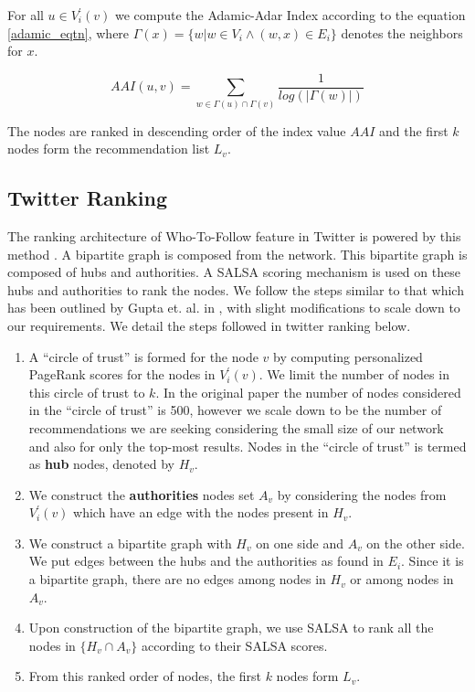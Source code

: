 For all $u \in V^{\prime}_{i}(v)$ we compute the Adamic-Adar Index according to the equation \ref{adamic_eqtn}, where $\Gamma(x)=\{w | w \in V_{i} \land (w,x) \in E_{i}\}$ denotes the neighbors for $x$. 

\begin{equation}
\label{adamic_eqtn}
AAI(u,v) = \sum_{w \in \Gamma(u) \cap \Gamma(v)}^{} \frac{1}{log(|\Gamma(w)|)}
\end{equation}

The nodes are ranked in descending order of the index value $AAI$ and the first $k$ nodes form the recommendation list $L_{v}$.

\subsection{Twitter Ranking}
The ranking architecture of Who-To-Follow feature in Twitter is powered by this method \cite{gupta2013wtf}. A bipartite graph is composed from the network. This bipartite graph is composed of hubs and authorities. A SALSA \cite{lempel2001salsa} scoring mechanism is used on these hubs and authorities to rank the nodes. We follow the steps similar to that which has been outlined by Gupta et. al. in \cite{gupta2013wtf}, with slight modifications to scale down to our requirements. We detail the steps followed in twitter ranking below.

\begin{enumerate}
	\item A ``circle of trust'' is formed for the node $v$ by computing personalized PageRank scores for the nodes in $V^{\prime}_{i}(v)$. We limit the number of nodes in this circle of trust to $k$. In the original paper the number of nodes considered in the ``circle of trust'' is 500, however we scale down to be the number of recommendations we are seeking considering the small size of our network and also for only the top-most results. Nodes in the ``circle of trust'' is termed as \textbf{hub} nodes, denoted by $H_{v}$.
	
	\item We construct the \textbf{authorities} nodes set $A_{v}$ by considering the nodes from $V^{\prime}_{i}(v)$ which have an edge with the nodes present in $H_{v}$.
	
	\item We construct a bipartite graph with $H_{v}$ on one side and $A_{v}$ on the other side. We put edges between the hubs and the authorities as found in $E_{i}$. Since it is a bipartite graph, there are no edges among nodes in $H_{v}$ or among nodes in $A_{v}$.
	
	\item Upon construction of the bipartite graph, we use SALSA \cite{lempel2001salsa} to rank all the nodes in $\{H_{v} \cap A_{v}\}$ according to their SALSA scores.
	
	\item From this ranked order of nodes, the first $k$ nodes form $L_{v}$. 
	
\end{enumerate}


